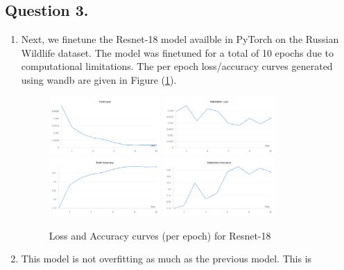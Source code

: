 \documentclass[10pt]{article}
\begin{document}
    \subsection*{\textbf{Question 3.}}
    \begin{enumerate}[label=(\alph*)]
        \item Next, we finetune the Resnet-18 model availble in PyTorch on the Russian Wildlife
        dataset. The model was finetuned for a total of 10 epochs due to computational limitations.
        The per epoch loss/accuracy curves generated using wandb are given in Figure
        (\ref{fig:resnet-loss-accuracy-curves}).
        \begin{figure}[h!]
            \centering
            \includegraphics[width=0.4\textwidth]{Assets/Classification/Resnet/01}
            \includegraphics[width=0.4\textwidth]{Assets/Classification/Resnet/02}
            \includegraphics[width=0.4\textwidth]{Assets/Classification/Resnet/03}
            \includegraphics[width=0.4\textwidth]{Assets/Classification/Resnet/04}
            \caption{Loss and Accuracy curves (per epoch) for Resnet-18}
            \label{fig:resnet-loss-accuracy-curves}
        \end{figure}
        \item This model is not overfitting as much as the previous model. This is

\end{enumerate}
\end{document}
